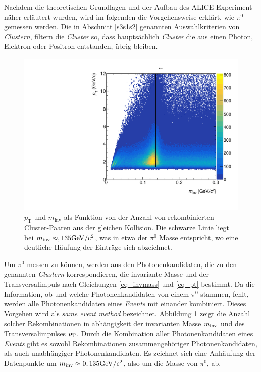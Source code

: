 Nachdem die theoretischen Grundlagen und der Aufbau des ALICE Experiment n\"aher erl\"autert wurden, wird im folgenden die Vorgehensweise erkl\"art, wie $\pi^{0}$ gemessen werden.
\newline
Die in Abschnitt \ref{s3s1s2} genannten Auswahlkriterien von \textit{Clustern}, filtern die \textit{Cluster} so, dass haupts\"achlich \textit{Cluster} die aus einen Photon, Elektron oder Positron entstanden, \"ubrig bleiben.
\newline
\begin{figure}[thp]
\centering
\includegraphics[width=.7\linewidth]{hInvMass_pT_Signal.pdf}
\caption{$p_\text{T}$ und $m_\text{inv}$ als Funktion von der Anzahl von rekombinierten  Cluster-Paaren aus der gleichen Kollision.
Die schwarze Linie liegt bei $m_{\text{inv}}\approx,135\rm{GeV/}c^{2}$, was in etwa der $\pi^{0}$ Masse entspricht, wo eine deutliche H\"aufung der Eintr\"age sich abzeichnet.}
\label{figInvMassPt_a}
\end{figure}
Um $\pi^{0}$ messen zu k\"onnen, werden aus den Photonenkandidaten, die zu den genannten \textit{Clustern} korrespondieren, die invariante Masse und der Transversalimpuls nach Gleichungen \ref{eq_invmass} und \ref{eq_pt} bestimmt.
Da die Information, ob und welche Photonenkandidaten von einem $\pi^{0}$ stammen, fehlt, werden alle Photonenkandidaten eines \textit{Events} mit einander kombiniert.
Dieses Vorgehen wird als \textit{same event method} bezeichnet.
Abbildung \ref{figInvMassPt_a} zeigt die Anzahl solcher Rekombinationen in abh\"angigkeit der invarianten Masse $m_{\rm{inv}}$ und des Transversalimpulses $p_{\rm{T}}$.
Durch die Kombination aller Photonenkandidaten eines \textit{Events} gibt es sowohl Rekombinationen zusammengeh\"origer Photonenkandidaten, als auch unabh\"angiger Photonenkandidaten.
Es zeichnet sich eine Anh\"aufung der Datenpunkte um $m_{\rm{inv}}\approx 0,135\rm{GeV}/c^{2}$, also um die Masse von $\pi^{0}$, ab.
